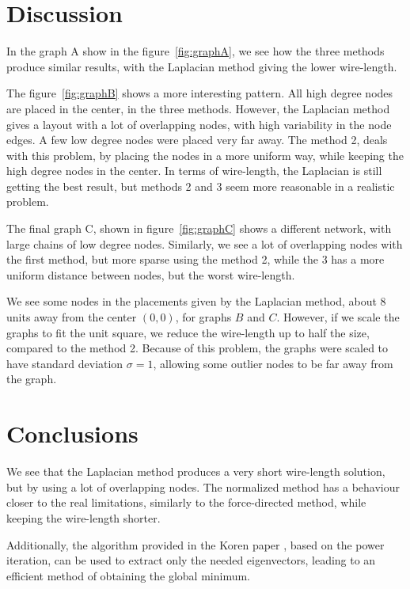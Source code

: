 \documentclass[a4paper,twocolumn]{article}
\begin{document}
\section{Discussion}

In the graph A show in the figure~\ref{fig:graphA}, we see how the three methods 
produce similar results, with the Laplacian method giving the lower wire-length.  

The figure~\ref{fig:graphB} shows a more interesting pattern. All high degree 
nodes are placed in the center, in the three methods. However, the Laplacian 
method gives a layout with a lot of overlapping nodes, with high variability in 
the node edges. A few low degree nodes were placed very far away. The method 2, 
deals with this problem, by placing the nodes in a more uniform way, while 
keeping the high degree nodes in the center. In terms of wire-length, the 
Laplacian is still getting the best result, but methods 2 and 3 seem more 
reasonable in a realistic problem.

The final graph C, shown in figure~\ref{fig:graphC} shows a different network, 
with large chains of low degree nodes. Similarly, we see a lot of overlapping 
nodes with the first method, but more sparse using the method 2, while the 3 has 
a more uniform distance between nodes, but the worst wire-length.

We see some nodes in the placements given by the Laplacian method, about 8 units 
away from the center $(0,0)$, for graphs $B$ and $C$. However, if we scale the 
graphs to fit the unit square, we reduce the wire-length up to half the size, 
compared to the method 2. Because of this problem, the graphs were scaled to 
have standard deviation $\sigma = 1$, allowing some outlier nodes to be far away 
from the graph.

\section{Conclusions}

We see that the Laplacian method produces a very short wire-length solution, but 
by using a lot of overlapping nodes. The normalized method has a behaviour 
closer to the real limitations, similarly to the force-directed method, while 
keeping the wire-length shorter.

Additionally, the algorithm provided in the Koren paper \cite{koren}, based on 
the power iteration, can be used to extract only the needed eigenvectors, 
leading to an efficient method of obtaining the global minimum.
\end{document}
